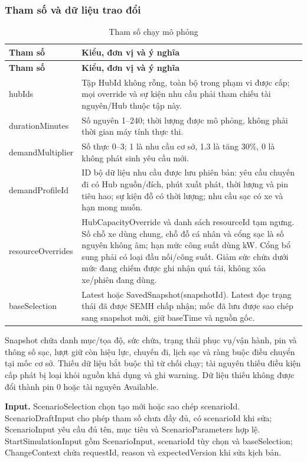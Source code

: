 \subsubsection{Tham số và dữ liệu trao đổi}
\begin{longtable}{|L{39mm}|L{100mm}|}
\caption{Tham số chạy mô phỏng}\\\hline
\textbf{Tham số} & \textbf{Kiểu, đơn vị và ý nghĩa}\\\hline
\endfirsthead
\hline\textbf{Tham số} & \textbf{Kiểu, đơn vị và ý nghĩa}\\\hline\endhead
hubIds & Tập HubId không rỗng, toàn bộ trong phạm vi được cấp; mọi override và sự kiện nhu cầu phải tham chiếu tài nguyên/Hub thuộc tập này.\\\hline
durationMinutes & Số nguyên 1--240; thời lượng được mô phỏng, không phải thời gian máy tính thực thi.\\\hline
demandMultiplier & Số thực 0--3; 1 là nhu cầu cơ sở, 1.3 là tăng 30\%, 0 là không phát sinh yêu cầu mới.\\\hline
demandProfileId & ID bộ dữ liệu nhu cầu được lưu phiên bản: yêu cầu chuyến đi có Hub nguồn/đích, phút xuất phát, thời lượng và pin tiêu hao; sự kiện đỗ có thời lượng; nhu cầu sạc có xe và hạn mong muốn.\\\hline
resourceOverrides & HubCapacityOverride và danh sách resourceId tạm ngưng. Số chỗ xe dùng chung, chỗ đỗ cá nhân và cổng sạc là số nguyên không âm; hạn mức công suất dùng kW. Cổng bổ sung phải có loại đầu nối/công suất. Giảm sức chứa dưới mức đang chiếm được ghi nhận quá tải, không xóa xe/phiên đang dùng.\\\hline
baseSelection & Latest hoặc SavedSnapshot(snapshotId). Latest đọc trạng thái đã được SEMH chấp nhận; mốc đã lưu được sao chép sang snapshot mới, giữ baseTime và nguồn gốc.\\\hline
\end{longtable}

Snapshot chứa danh mục/tọa độ, sức chứa, trạng thái phục vụ/vận hành, pin và thông số sạc, lượt giữ còn hiệu lực, chuyến đi, lịch sạc và ràng buộc điều chuyển tại mốc cơ sở. Thiếu dữ liệu bắt buộc thì từ chối chạy; tài nguyên thiếu điều kiện cấp phát bị loại khỏi nguồn khả dụng và ghi warning. Dữ liệu thiếu không được đổi thành pin 0 hoặc tài nguyên Available.

\textbf{Input.} ScenarioSelection chọn tạo mới hoặc sao chép scenarioId. ScenarioDraftInput cho phép tham số chưa đầy đủ, có scenarioId khi sửa; ScenarioInput yêu cầu đủ tên, mục tiêu và ScenarioParameters hợp lệ. StartSimulationInput gồm ScenarioInput, scenarioId tùy chọn và baseSelection; ChangeContext chứa requestId, reason và expectedVersion khi sửa kịch bản.


